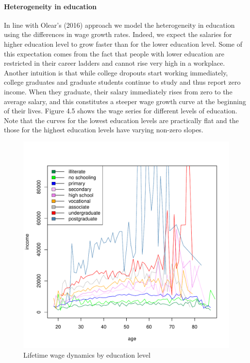 \documentclass[]{elsarticle}
\begin{document}
\paragraph{Heterogeneity in education}
In line with Olear's (2016) approach we model the heterogeneity in education using the differences in wage growth rates. Indeed, we expect the salaries for higher education level to grow faster than for the lower education level. Some of this expectation comes from the fact that people with lower education are restricted in their career ladders and cannot rise very high in a workplace. Another intuition is that while college dropouts start working immediately, college graduates and graduate students continue to study and thus report zero income. When they graduate, their salary immediately rises from zero to the average salary, and this constitutes a steeper wage growth curve at the beginning of their lives. Figure 4.5 shows the wage series for different levels of education. Note that the curves for the lowest education levels are practically flat and the those for the highest education levels have varying non-zero slopes. 

\begin{figure}[h]
	\centering
	\includegraphics[scale=0.6]{figs/wage2educ.pdf}
	\caption{Lifetime wage dynamics by education level}
\end{figure}
\end{document}
